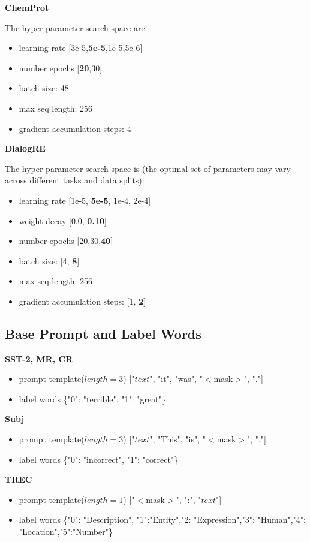 \documentclass{article} \usepackage{iclr2022_conference,times}
\begin{document}
\textbf{ChemProt}

The hyper-parameter search space are:
\begin{itemize}
\item learning rate
[3e-5,\textbf{5e-5},1e-5,5e-6]
\item number epochs [\textbf{20},30]
\item batch size: 48
\item max seq length: 256
\item gradient accumulation steps: 4
\end{itemize}

\textbf{DialogRE}

The hyper-parameter search space is (the optimal set of parameters may vary across different tasks and data splits):
\begin{itemize}
\item learning rate
[1e-5, \textbf{5e-5}, 1e-4, 2e-4]
\item weight decay
[0.0, \textbf{0.10}]
\item number epochs [20,30,\textbf{40}]
\item batch size: [4, \textbf{8}]
\item max seq length: 256
\item gradient accumulation steps: [1, \textbf{2}]
\end{itemize}

\subsection{Base Prompt and Label Words}

\textbf{SST-2, MR, CR}
\begin{itemize}
\item prompt template($length=3$)
["$text$", "it", "was", "$<$mask$>$", "."]
\item label words
\{"0": "terrible", "1": "great"\}
\end{itemize}

\textbf{Subj}
\begin{itemize}
\item prompt template($length=3$)
["$text$", "This", "is", "$<$mask$>$", "."]
\item label words
\{"0": "incorrect", "1": "correct"\}
\end{itemize}

\textbf{TREC}
\begin{itemize}
\item prompt template($length=1$)
["$<$mask$>$", ":", "$text$"]
\item label words
\{"0": "Description", "1":"Entity","2: "Expression","3": "Human","4": "Location","5":"Number"\}
\end{itemize}
\end{document}
